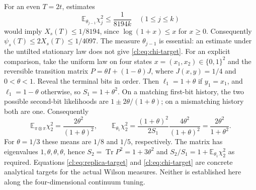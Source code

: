 For an even $T=2t$, estimates
\begin{equation}\label{cl:eq:chi-target}
\mathbb E_{\theta_{j-1}}\chi_j^2\le\frac1{8194k}
\quad(1\le j\le k)
\end{equation}
would imply $X_s(T)\le1/8194$, since $\log(1+x)\le x$ for $x\ge0$.
Consequently $\psi_s(T)\le2X_s(T)\le1/4097$.
The measure $\theta_{j-1}$ is essential: an estimate under the untilted
stationary law does not give \eqref{cl:eq:chi-target}.
For an explicit comparison, take the uniform law on four states
$x=(x_1,x_2)\in\{0,1\}^2$ and the reversible transition matrix
$P=\theta I+(1-\theta)J$, where $J(x,y)=1/4$ and $0<\theta<1$.
Reveal the terminal bits in order. Then
$\ell_1=1+\theta$ if $y_1=x_1$, and $\ell_1=1-\theta$ otherwise,
so $S_1=1+\theta^2$. On a matching first-bit history, the two possible
second-bit likelihoods are $1\pm2\theta/(1+\theta)$; on a mismatching
history both are one. Consequently
\[
\mathbb E_{\pi\otimes\pi}\chi_2^2
=\frac{2\theta^2}{(1+\theta)^2},\qquad
\mathbb E_{\theta_1}\chi_2^2
=\frac{(1+\theta)^2}{2S_1}
                       \frac{4\theta^2}{(1+\theta)^2}
=\frac{2\theta^2}{1+\theta^2}.
\]
For $\theta=1/3$ these means are $1/8$ and $1/5$, respectively.
The matrix has eigenvalues $1,\theta,\theta,\theta$, hence
$S_2=\operatorname{Tr}P^2=1+3\theta^2$ and
$S_2/S_1=1+\mathbb E_{\theta_1}\chi_2^2$ as required.
Equations \eqref{cl:eq:replica-target} and \eqref{cl:eq:chi-target}
are concrete analytical targets for the actual Wilson measures.
Neither is established here along the four-dimensional continuum tuning.

